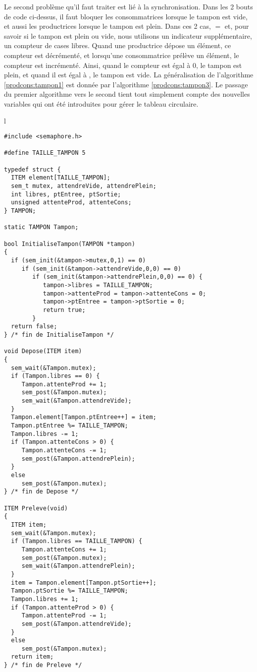 Le second problème qu'il faut traiter est lié à la synchronisation. Dans les 2 bouts de code ci-dessus, il faut bloquer les consommatrices lorsque le tampon est vide, et aussi les productrices lorsque le tampon est plein. Dans ces 2 cas,  $=$  et, pour savoir si le tampon est plein ou vide, nous utilisons un indicateur supplémentaire, un compteur de cases libres. Quand une productrice dépose un élément, ce compteur est décrémenté, et lorsqu'une consommatrice prélève un élément, le compteur est incrémenté. Ainsi, quand le compteur est égal à 0, le tampon est plein, et quand il est égal à , le tampon est vide.
La généralisation de l'algorithme \ref{prodcons:tampon1} est donnée par l'algorithme \ref{prodcons:tampon3}. Le passage du premier algorithme vers le second tient tout simplement compte des nouvelles variables qui ont été introduites pour gérer le tableau circulaire.
\begin{algorithm}[!ht]
\caption{Extension de l'algorithme \ref{prodcons:tampon1}}\label{prodcons:tampon3}
\begin{center}
\begin{tabular}{l}
\lstset{language=C++}
\begin{lstlisting}
#include <semaphore.h>

#define TAILLE_TAMPON 5

typedef struct {
  ITEM element[TAILLE_TAMPON];
  sem_t mutex, attendreVide, attendrePlein;
  int libres, ptEntree, ptSortie;
  unsigned attenteProd, attenteCons;
} TAMPON;

static TAMPON Tampon;

bool InitialiseTampon(TAMPON *tampon)
{
  if (sem_init(&tampon->mutex,0,1) == 0)
     if (sem_init(&tampon->attendreVide,0,0) == 0)
        if (sem_init(&tampon->attendrePlein,0,0) == 0) {
           tampon->libres = TAILLE_TAMPON;
           tampon->attenteProd = tampon->attenteCons = 0;
           tampon->ptEntree = tampon->ptSortie = 0;
           return true;
        }
  return false;
} /* fin de InitialiseTampon */

void Depose(ITEM item)
{
  sem_wait(&Tampon.mutex);
  if (Tampon.libres == 0) {
     Tampon.attenteProd += 1;
     sem_post(&Tampon.mutex);
     sem_wait(&Tampon.attendreVide);
  }
  Tampon.element[Tampon.ptEntree++] = item;
  Tampon.ptEntree %= TAILLE_TAMPON;
  Tampon.libres -= 1;
  if (Tampon.attenteCons > 0) {
     Tampon.attenteCons -= 1;
     sem_post(&Tampon.attendrePlein);
  }
  else
     sem_post(&Tampon.mutex);
} /* fin de Depose */

ITEM Preleve(void)
{
  ITEM item;
  sem_wait(&Tampon.mutex);
  if (Tampon.libres == TAILLE_TAMPON) {
     Tampon.attenteCons += 1;
     sem_post(&Tampon.mutex);
     sem_wait(&Tampon.attendrePlein);
  }
  item = Tampon.element[Tampon.ptSortie++];
  Tampon.ptSortie %= TAILLE_TAMPON;
  Tampon.libres += 1;
  if (Tampon.attenteProd > 0) {
     Tampon.attenteProd -= 1;
     sem_post(&Tampon.attendreVide);
  }
  else
     sem_post(&Tampon.mutex);
  return item;
} /* fin de Preleve */
\end{lstlisting}
\end{tabular}
\end{center}
\end{algorithm}

